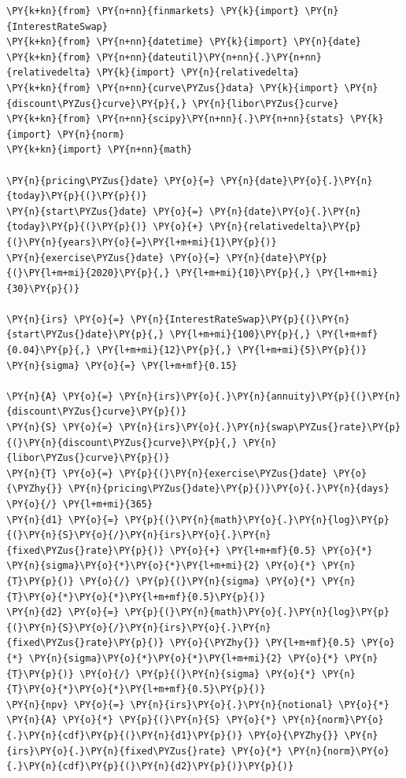 \begin{Answer}
\begin{tcolorbox}[size=fbox, boxrule=1pt, colback=cellbackground, colframe=cellborder]	
\begin{Verbatim}[commandchars=\\\{\}]
\PY{k+kn}{from} \PY{n+nn}{finmarkets} \PY{k}{import} \PY{n}{InterestRateSwap}
\PY{k+kn}{from} \PY{n+nn}{datetime} \PY{k}{import} \PY{n}{date}
\PY{k+kn}{from} \PY{n+nn}{dateutil}\PY{n+nn}{.}\PY{n+nn}{relativedelta} \PY{k}{import} \PY{n}{relativedelta}
\PY{k+kn}{from} \PY{n+nn}{curve\PYZus{}data} \PY{k}{import} \PY{n}{discount\PYZus{}curve}\PY{p}{,} \PY{n}{libor\PYZus{}curve}
\PY{k+kn}{from} \PY{n+nn}{scipy}\PY{n+nn}{.}\PY{n+nn}{stats} \PY{k}{import} \PY{n}{norm}
\PY{k+kn}{import} \PY{n+nn}{math}
	
\PY{n}{pricing\PYZus{}date} \PY{o}{=} \PY{n}{date}\PY{o}{.}\PY{n}{today}\PY{p}{(}\PY{p}{)}
\PY{n}{start\PYZus{}date} \PY{o}{=} \PY{n}{date}\PY{o}{.}\PY{n}{today}\PY{p}{(}\PY{p}{)} \PY{o}{+} \PY{n}{relativedelta}\PY{p}{(}\PY{n}{years}\PY{o}{=}\PY{l+m+mi}{1}\PY{p}{)}
\PY{n}{exercise\PYZus{}date} \PY{o}{=} \PY{n}{date}\PY{p}{(}\PY{l+m+mi}{2020}\PY{p}{,} \PY{l+m+mi}{10}\PY{p}{,} \PY{l+m+mi}{30}\PY{p}{)}
	
\PY{n}{irs} \PY{o}{=} \PY{n}{InterestRateSwap}\PY{p}{(}\PY{n}{start\PYZus{}date}\PY{p}{,} \PY{l+m+mi}{100}\PY{p}{,} \PY{l+m+mf}{0.04}\PY{p}{,} \PY{l+m+mi}{12}\PY{p}{,} \PY{l+m+mi}{5}\PY{p}{)}
\PY{n}{sigma} \PY{o}{=} \PY{l+m+mf}{0.15}
	
\PY{n}{A} \PY{o}{=} \PY{n}{irs}\PY{o}{.}\PY{n}{annuity}\PY{p}{(}\PY{n}{discount\PYZus{}curve}\PY{p}{)}
\PY{n}{S} \PY{o}{=} \PY{n}{irs}\PY{o}{.}\PY{n}{swap\PYZus{}rate}\PY{p}{(}\PY{n}{discount\PYZus{}curve}\PY{p}{,} \PY{n}{libor\PYZus{}curve}\PY{p}{)}
\PY{n}{T} \PY{o}{=} \PY{p}{(}\PY{n}{exercise\PYZus{}date} \PY{o}{\PYZhy{}} \PY{n}{pricing\PYZus{}date}\PY{p}{)}\PY{o}{.}\PY{n}{days} \PY{o}{/} \PY{l+m+mi}{365}
\PY{n}{d1} \PY{o}{=} \PY{p}{(}\PY{n}{math}\PY{o}{.}\PY{n}{log}\PY{p}{(}\PY{n}{S}\PY{o}{/}\PY{n}{irs}\PY{o}{.}\PY{n}{fixed\PYZus{}rate}\PY{p}{)} \PY{o}{+} \PY{l+m+mf}{0.5} \PY{o}{*} \PY{n}{sigma}\PY{o}{*}\PY{o}{*}\PY{l+m+mi}{2} \PY{o}{*} \PY{n}{T}\PY{p}{)} \PY{o}{/} \PY{p}{(}\PY{n}{sigma} \PY{o}{*} \PY{n}{T}\PY{o}{*}\PY{o}{*}\PY{l+m+mf}{0.5}\PY{p}{)}
\PY{n}{d2} \PY{o}{=} \PY{p}{(}\PY{n}{math}\PY{o}{.}\PY{n}{log}\PY{p}{(}\PY{n}{S}\PY{o}{/}\PY{n}{irs}\PY{o}{.}\PY{n}{fixed\PYZus{}rate}\PY{p}{)} \PY{o}{\PYZhy{}} \PY{l+m+mf}{0.5} \PY{o}{*} \PY{n}{sigma}\PY{o}{*}\PY{o}{*}\PY{l+m+mi}{2} \PY{o}{*} \PY{n}{T}\PY{p}{)} \PY{o}{/} \PY{p}{(}\PY{n}{sigma} \PY{o}{*} \PY{n}{T}\PY{o}{*}\PY{o}{*}\PY{l+m+mf}{0.5}\PY{p}{)}
\PY{n}{npv} \PY{o}{=} \PY{n}{irs}\PY{o}{.}\PY{n}{notional} \PY{o}{*} \PY{n}{A} \PY{o}{*} \PY{p}{(}\PY{n}{S} \PY{o}{*} \PY{n}{norm}\PY{o}{.}\PY{n}{cdf}\PY{p}{(}\PY{n}{d1}\PY{p}{)} \PY{o}{\PYZhy{}} \PY{n}{irs}\PY{o}{.}\PY{n}{fixed\PYZus{}rate} \PY{o}{*} \PY{n}{norm}\PY{o}{.}\PY{n}{cdf}\PY{p}{(}\PY{n}{d2}\PY{p}{)}\PY{p}{)}
	

\end{Verbatim}
\end{tcolorbox}
\end{Answer}
